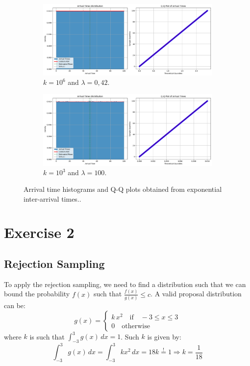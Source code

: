 \documentclass[a4paper]{article}
\begin{document}
\begin{figure}[htbp]
  \centering
  \begin{subfigure}[b]{0.48\textwidth}
    \centering
    \includegraphics[width=\textwidth]{images/ex1-p2.png}
    \caption{$k = 10^6$ and $\lambda = 0,42$.}\label{fig:ex1-p2}
  \end{subfigure}
  \hfill
  \begin{subfigure}[b]{0.48\textwidth}
    \centering
    \includegraphics[width=\textwidth]{images/ex1-p2-hl.png}
    \caption{$k = 10^3$ and $\lambda = 100$.}\label{fig:ex1-p2-hl}
  \end{subfigure}
  \caption{Arrival time histograms and Q-Q plots obtained from
  exponential inter-arrival times..}\label{fig:ex1-p2-combined}
\end{figure}

\section*{Exercise 2}

\subsection*{Rejection Sampling}
To apply the rejection sampling, we need to find a distribution such
that we can bound the probability $f(x)$ such that $\frac{f(x)}{g(x)} \leq c$. A valid proposal distribution can be:
\begin{equation*}
  g(x) =
  \begin{cases}
    k \, x^2 \quad \text{if} \quad -3\leq x\leq3 \\
    0 \quad \text{otherwise}
  \end{cases}
\end{equation*}
where $k$ is such that $\int_{-3}^{3} g(x) \, dx =1$.
Such $k$ is given by:
\begin{equation*}
  \int_{-3}^{3} g(x) \, dx =\int_{-3}^{3} kx^2 \, dx =  18k
  \overset{!}{=} 1 \Rightarrow k = \frac{1}{18}
\end{equation*}
\end{document}
